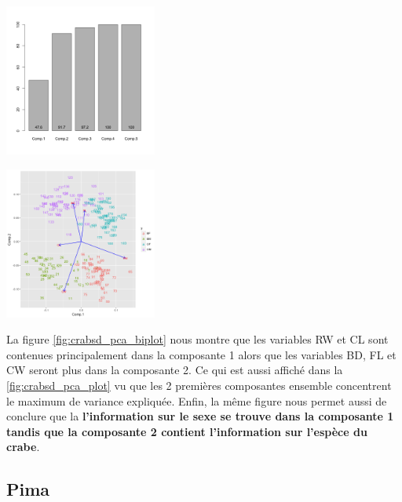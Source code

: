 \documentclass[10pt]{article}
\begin{document}
	\begin{minipage}{.5\textwidth}
		\centering
		\includegraphics[width=50mm]{Figures/Crabs/decorr_pca_plot.png}
		\label{fig:crabsd_pca_plot}
	\end{minipage}%
	\hspace{0.08\linewidth}
	\begin{minipage}{.5\textwidth}
		\centering
		\includegraphics[width=50mm]{Figures/Crabs/decorr_pca_biplot.png}
		\label{fig:crabsd_pca_biplot}
	\end{minipage}
	
	\vspace{2mm}
	La figure  \ref{fig:crabsd_pca_biplot} nous montre que les variables RW et CL sont contenues principalement dans la composante 1 alors que les variables BD, FL et CW seront plus dans la composante 2. Ce qui est aussi affiché dans la \ref{fig:crabsd_pca_plot} vu que les 2 premières composantes ensemble concentrent le maximum de variance expliquée. Enfin, la même figure nous permet aussi de conclure que la \textbf{l'information sur le sexe se trouve dans la composante 1 tandis que la composante 2 contient l'information sur l'espèce du crabe}. 
\subsection{Pima}
\end{document}
